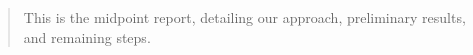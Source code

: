 \begin{abstract}

This is the midpoint report, detailing our approach, preliminary results, and remaining steps.
\end{abstract}
